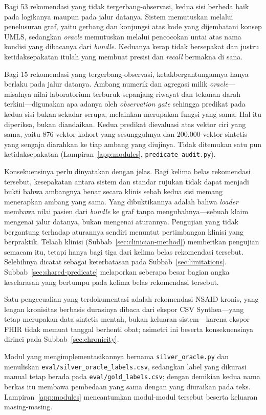 Bagi 53 rekomendasi yang tidak tergerbang-observasi, kedua sisi berbeda baik pada logikanya
maupun pada jalur datanya. Sistem memutuskan melalui penelusuran graf, yaitu gerbang dan
konjungsi atas kode yang dijembatani konsep UMLS, sedangkan \emph{oracle} memutuskan melalui
pencocokan untai atas nama kondisi yang dibacanya dari \emph{bundle}. Keduanya kerap tidak
bersepakat dan justru ketidaksepakatan itulah yang membuat presisi dan \emph{recall} bermakna
di sana.

Bagi 15 rekomendasi yang tergerbang-observasi, ketakbergantungannya hanya berlaku pada jalur
datanya. Ambang numerik dan agregasi milik \emph{oracle}---misalnya nilai laboratorium terburuk
sepanjang riwayat dan tekanan darah terkini---digunakan apa adanya oleh \emph{observation
gate} sehingga predikat pada kedua sisi bukan sekadar serupa, melainkan merupakan fungsi yang
sama. Hal itu diperiksa, bukan diandaikan. Kedua predikat dievaluasi atas vektor ciri yang sama,
yaitu 876 vektor kohort yang sesungguhnya dan 200.000 vektor sintetis yang sengaja diarahkan
ke tiap ambang yang diujinya. Tidak ditemukan satu pun ketidaksepakatan
(Lampiran~\ref{app:modules}, \texttt{predicate\_audit.py}).

Konsekuensinya perlu dinyatakan dengan jelas. Bagi kelima belas rekomendasi tersebut,
kesepakatan antara sistem dan standar rujukan tidak dapat menjadi bukti bahwa ambangnya benar
secara klinis sebab kedua sisi memang menerapkan ambang yang sama. Yang dibuktikannya adalah
bahwa \emph{loader} membawa nilai pasien dari \emph{bundle} ke graf tanpa mengubahnya---sebuah
klaim mengenai jalur datanya, bukan mengenai aturannya. Pengujian yang tidak bergantung
terhadap aturannya sendiri menuntut pertimbangan klinisi yang berpraktik. Telaah klinisi
(Subbab~\ref{sec:clinician-method}) memberikan pengujian semacam itu, tetapi hanya bagi tiga
dari kelima belas rekomendasi tersebut. Selebihnya dicatat sebagai keterbatasan pada
Subbab~\ref{sec:limitations}.
Subbab~\ref{sec:shared-predicate} melaporkan seberapa besar bagian angka keselarasan yang
bertumpu pada kelima belas rekomendasi tersebut.

Satu
pengecualian yang terdokumentasi adalah rekomendasi NSAID kronis, yang lengan kronisitas
berbasis durasinya dibaca dari ekspor CSV Synthea---yang tetap merupakan data sintetis mentah,
bukan keluaran sistem---karena ekspor FHIR tidak memuat tanggal berhenti obat;
asimetri ini beserta konsekuensinya dirinci pada Subbab~\ref{sec:chronicity}.

Modul yang mengimplementasikannya bernama \texttt{silver\_oracle.py} dan menuliskan
\texttt{eval/silver\_oracle\_labels.csv}, sedangkan label yang dikurasi manual tetap berada pada
\texttt{eval/gold\_labels.csv}; dengan demikian kedua nama berkas itu membawa pembedaan yang
sama dengan yang diuraikan pada teks. Lampiran~\ref{app:modules} mencantumkan modul-modul tersebut beserta
keluaran masing-masing.

